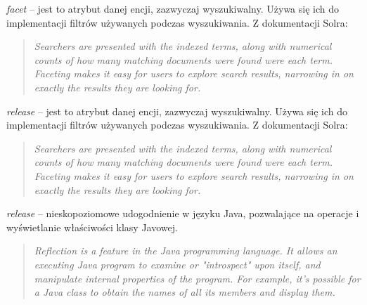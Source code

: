 \noindent
\textit{facet} -- jest to atrybut danej encji, zazwyczaj wyszukiwalny. Używa się ich do implementacji filtrów używanych podczas wyszukiwania. Z dokumentacji Solra:
\begin{quote} \textit{
	Searchers are presented with the indexed terms, along with numerical counts of how many matching documents were found were each term. Faceting makes it easy for users to explore search results, narrowing in on exactly the results they are looking for.
	}\cite{Solr}
\end{quote}


\noindent
\textit{release} -- jest to atrybut danej encji, zazwyczaj wyszukiwalny. Używa się ich do implementacji filtrów używanych podczas wyszukiwania. Z dokumentacji Solra:
\begin{quote} \textit{
		Searchers are presented with the indexed terms, along with numerical counts of how many matching documents were found were each term. Faceting makes it easy for users to explore search results, narrowing in on exactly the results they are looking for.
	}\cite{Solr}
\end{quote}

\noindent
\textit{release} -- nieskopoziomowe udogodnienie w języku Java, pozwalające na operacje i wyświetlanie właściwości klasy Javowej.
\begin{quote} \textit{
		Reflection is a feature in the Java programming language. It allows an executing Java program to examine or "introspect" upon itself, and manipulate internal properties of the program. For example, it's possible for a Java class to obtain the names of all its members and display them.
	}\cite{oracle}
\end{quote}




